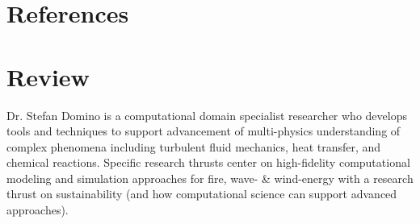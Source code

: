 \documentclass[letterpaper]{twentysecondcv_spd} %
\begin{document}
\section{References}

\begin{twentysingle} 

	
\end{twentysingle}

\section{Review}

Dr. Stefan Domino is a computational domain specialist researcher who develops tools and techniques
to support advancement of multi-physics understanding of complex phenomena including turbulent 
fluid mechanics, heat transfer, and chemical reactions. Specific research thrusts center on high-fidelity
computational modeling and simulation approaches for fire, wave- \& wind-energy with a research thrust on sustainability (and how computational science can support advanced approaches).
\end{document}
